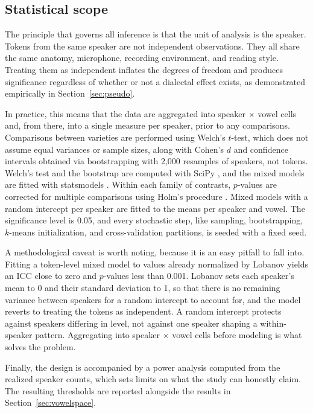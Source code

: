 \documentclass[11pt]{article}
\begin{document}
\subsection{Statistical scope}

The principle that governs all inference is that the unit of analysis is the
speaker. Tokens from the same speaker are not independent observations. They all
share the same anatomy, microphone, recording environment, and reading style.
Treating them as independent inflates the degrees of freedom and produces
significance regardless of whether or not a dialectal effect exists, as
demonstrated empirically in Section~\ref{sec:pseudo}.

In practice, this means that the data are aggregated into speaker $\times$ vowel
cells and, from there, into a single measure per speaker, prior to any
comparisons. Comparisons between varieties are performed using Welch's $t$-test,
which does not assume equal variances or sample sizes, along with Cohen's $d$
\citep{cohen1988} and confidence intervals obtained via bootstrapping with 2,000
resamples of speakers, not tokens. Welch's test and the bootstrap are computed
with SciPy \citep{virtanen2020}, and the mixed models are fitted with statsmodels
\citep{seabold2010}. Within each family of contrasts, $p$-values are corrected
for multiple comparisons using Holm's procedure \citep{holm1979}. Mixed models
with a random intercept per speaker are fitted to the means per speaker and
vowel. The significance level is 0.05, and every stochastic step, like sampling,
bootstrapping, $k$-means initialization, and cross-validation partitions, is
seeded with a fixed seed.

A methodological caveat is worth noting, because it is an easy pitfall to fall
into. Fitting a token-level mixed model to values already normalized by Lobanov
yields an ICC close to zero and $p$-values less than 0.001. Lobanov sets each
speaker's mean to 0 and their standard deviation to 1, so that there is no
remaining variance between speakers for a random intercept to account for, and
the model reverts to treating the tokens as independent. A random intercept
protects against speakers differing in level, not against one speaker shaping a
within-speaker pattern. Aggregating into speaker $\times$ vowel cells before
modeling is what solves the problem.

Finally, the design is accompanied by a power analysis computed from the realized
speaker counts, which sets limits on what the study can honestly claim. The
resulting thresholds are reported alongside the results in
Section~\ref{sec:vowelspace}.
\end{document}

